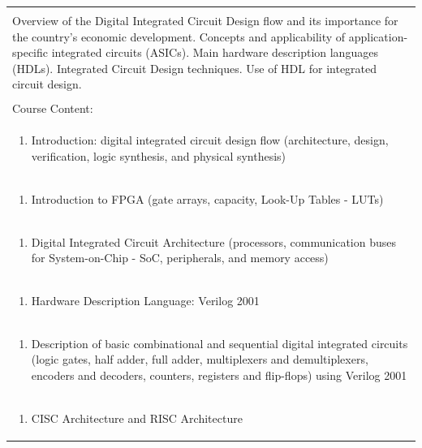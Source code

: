 \documentclass[11pt]{article}
\begin{document}
\begin{center}
\begin{longtable}{|p{4cm}|p{4cm}|p{4cm}|p{4cm}|}
\multicolumn{4}{|p{16cm}|}{}\\
\multicolumn{4}{|p{\dimexpr 16cm + 6\tabcolsep\relax}|}{Overview of the Digital Integrated Circuit Design flow and its importance for the country's economic development. Concepts and applicability of application-specific integrated circuits (ASICs). Main hardware description languages (HDLs). Integrated Circuit Design techniques. Use of HDL for integrated circuit design.}\\
\multicolumn{4}{|p{16cm}|}{}\\
\hline
\multicolumn{4}{|p{16cm}|}{Course Content:}\\*
\multicolumn{4}{|p{\dimexpr 16cm + 6\tabcolsep\relax}|}{\begin{enumerate}[start=1]\item Introduction: digital integrated circuit design flow (architecture, design, verification, logic synthesis, and physical synthesis)\end{enumerate}}\\
\multicolumn{4}{|p{\dimexpr 16cm + 6\tabcolsep\relax}|}{\begin{enumerate}[start=2]\item Introduction to FPGA (gate arrays, capacity, Look-Up Tables - LUTs)\end{enumerate}}\\
\multicolumn{4}{|p{\dimexpr 16cm + 6\tabcolsep\relax}|}{\begin{enumerate}[start=3]\item Digital Integrated Circuit Architecture (processors, communication buses for System-on-Chip - SoC, peripherals, and memory access)\end{enumerate}}\\
\multicolumn{4}{|p{\dimexpr 16cm + 6\tabcolsep\relax}|}{\begin{enumerate}[start=4]\item Hardware Description Language: Verilog 2001\end{enumerate}}\\
\multicolumn{4}{|p{\dimexpr 16cm + 6\tabcolsep\relax}|}{\begin{enumerate}[start=5]\item Description of basic combinational and sequential digital integrated circuits (logic gates, half adder, full adder, multiplexers and demultiplexers, encoders and decoders, counters, registers and flip-flops) using Verilog 2001\end{enumerate}}\\
\multicolumn{4}{|p{\dimexpr 16cm + 6\tabcolsep\relax}|}{\begin{enumerate}[start=6]\item CISC Architecture and RISC Architecture\end{enumerate}}\\

\end{longtable}
\end{center}
\end{document}
